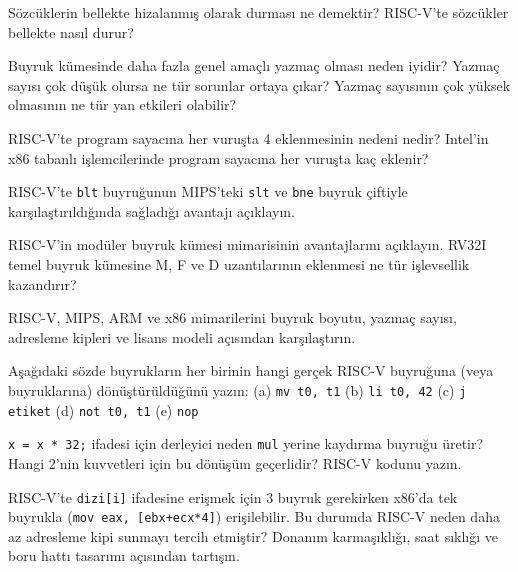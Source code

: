 \begin{alistirma}[\kolay]
Sözcüklerin bellekte hizalanmış olarak durması ne demektir? RISC-V'te sözcükler bellekte nasıl durur?
\end{alistirma}

\begin{alistirma}[\orta]
Buyruk kümesinde daha fazla genel amaçlı yazmaç olması neden iyidir? Yazmaç sayısı çok düşük olursa ne tür sorunlar ortaya çıkar? Yazmaç sayısının çok yüksek olmasının ne tür yan etkileri olabilir?
\end{alistirma}

\begin{alistirma}[\orta]
RISC-V'te program sayacına her vuruşta 4 eklenmesinin nedeni nedir? Intel'in x86 tabanlı işlemcilerinde program sayacına her vuruşta kaç eklenir?
\end{alistirma}

\begin{alistirma}[\orta]
RISC-V'te \texttt{blt} buyruğunun MIPS'teki \texttt{slt} ve \texttt{bne} buyruk çiftiyle karşılaştırıldığında sağladığı avantajı açıklayın.
\end{alistirma}

\begin{alistirma}[\orta]
RISC-V'in modüler buyruk kümesi mimarisinin avantajlarını açıklayın. RV32I temel buyruk kümesine M, F ve D uzantılarının eklenmesi ne tür işlevsellik kazandırır?
\end{alistirma}

\begin{alistirma}[\zor]
RISC-V, MIPS, ARM ve x86 mimarilerini buyruk boyutu, yazmaç sayısı, adresleme kipleri ve lisans modeli açısından karşılaştırın.
\end{alistirma}

\begin{alistirma}[\kolay]
Aşağıdaki sözde buyrukların her birinin hangi gerçek RISC-V buyruğuna (veya buyruklarına) dönüştürüldüğünü yazın: (a) \texttt{mv t0, t1} \quad (b) \texttt{li t0, 42} \quad (c) \texttt{j etiket} \quad (d) \texttt{not t0, t1} \quad (e) \texttt{nop}
\end{alistirma}

\begin{alistirma}[\orta]
\texttt{x = x * 32;} ifadesi için derleyici neden \texttt{mul} yerine kaydırma buyruğu üretir? Hangi 2'nin kuvvetleri için bu dönüşüm geçerlidir? RISC-V kodunu yazın.
\end{alistirma}

\begin{alistirma}[\orta]
RISC-V'te \texttt{dizi[i]} ifadesine erişmek için 3 buyruk gerekirken x86'da tek buyrukla (\texttt{mov eax, [ebx+ecx*4]}) erişilebilir. Bu durumda RISC-V neden daha az adresleme kipi sunmayı tercih etmiştir? Donanım karmaşıklığı, saat sıklığı ve boru hattı tasarımı açısından tartışın.
\end{alistirma}

